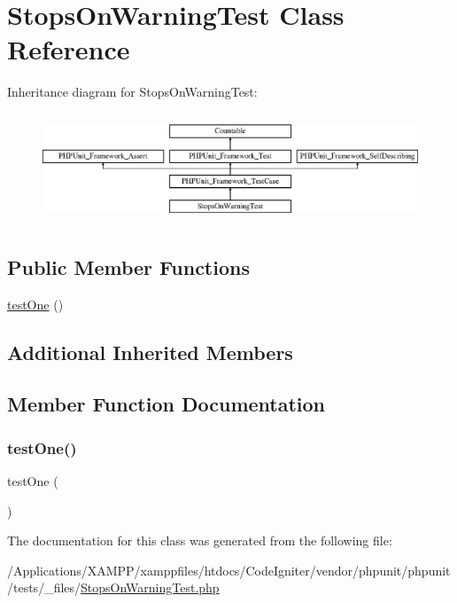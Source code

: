 \hypertarget{class_stops_on_warning_test}{}\section{Stops\+On\+Warning\+Test Class Reference}
\label{class_stops_on_warning_test}
Inheritance diagram for Stops\+On\+Warning\+Test\+:\begin{figure}[H]
\begin{center}
\leavevmode
\includegraphics[height=3.303835cm]{class_stops_on_warning_test}
\end{center}
\end{figure}
\subsection*{Public Member Functions}
\begin{DoxyCompactItemize}
\item 
\mbox{\hyperlink{class_stops_on_warning_test_afbf3ff88b322c6a7197ce02297cd23a0}{test\+One}} ()
\end{DoxyCompactItemize}
\subsection*{Additional Inherited Members}


\subsection{Member Function Documentation}
\mbox{\label{class_stops_on_warning_test_afbf3ff88b322c6a7197ce02297cd23a0}} 
\subsubsection{\texorpdfstring{test\+One()}{testOne()}}
{\footnotesize\ttfamily test\+One (\begin{DoxyParamCaption}{ }\end{DoxyParamCaption})}



The documentation for this class was generated from the following file\+:\begin{DoxyCompactItemize}
\item 
/\+Applications/\+X\+A\+M\+P\+P/xamppfiles/htdocs/\+Code\+Igniter/vendor/phpunit/phpunit/tests/\+\_\+files/\mbox{\hyperlink{_stops_on_warning_test_8php}{Stops\+On\+Warning\+Test.\+php}}\end{DoxyCompactItemize}
